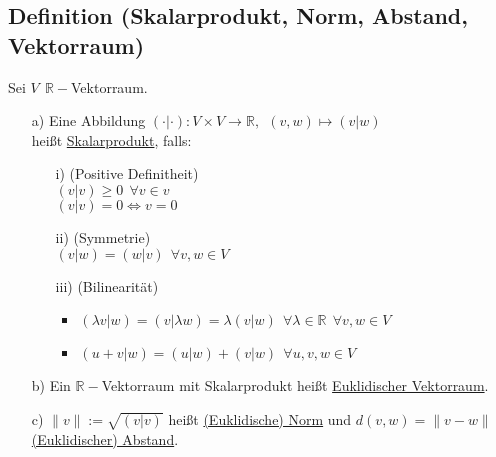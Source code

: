 \documentclass[a4paper, 12pt,titlepage, pdf, headsepline]{scrartcl}
\newcommand{\R}{\mathds{R}}
\newcommand{\uline}[1]{\underline{#1}}
\renewcommand{\>}{\rightarrow}
\renewcommand{\*}{\cdot}
\begin{document}
\subsection{Definition (Skalarprodukt, Norm, Abstand, Vektorraum)}
\label{10.2}
Sei $V ~~\R-$Vektorraum.
\begin{itemize}
	\item[a)] Eine Abbildung $(\cdot | \cdot): V \times V \rightarrow \R,~~ (v,w)\mapsto (v|w)$\\
	heißt \uline{Skalarprodukt}, falls:
	\begin{itemize}
		\item[i)] (Positive Definitheit)\\
		$(v|v) \geq 0 ~~\forall v \in v$\\
		$(v|v) = 0 \Leftrightarrow v= 0$ 
		\item[ii)] (Symmetrie)\\$(v|w) = (w|v)~~ \forall v,w \in V$ 
		\item[iii)] (Bilinearität)
		\begin{itemize}
			\item $(\lambda v|w) = (v|\lambda w) = \lambda(v|w)~~ \forall \lambda \in \R ~~\forall v,w \in V$
			\item $(u+v | w) = (u|w) + (v|w) ~~\forall u,v,w \in V$
		\end{itemize}
		
	\end{itemize}
	\item[b)] Ein $\R-$Vektorraum mit Skalarprodukt heißt \uline{Euklidischer Vektorraum}.
	\item[c)] $\|v\| := \sqrt{(v|v)}$ heißt \uline{(Euklidische) Norm} und $d(v,w) = \|v -w\|$ \uline{(Euklidischer) Abstand}.
\end{itemize}
\end{document}
